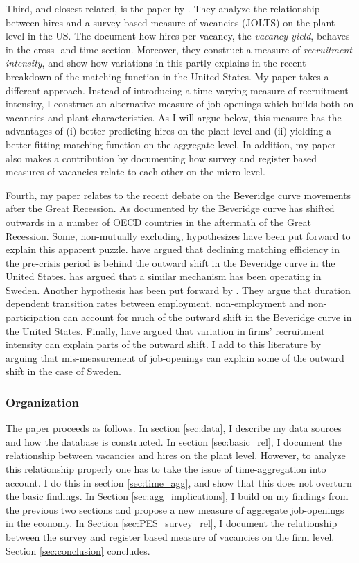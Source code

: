 Third, and closest related, is the paper by \cite{Davis2013}. They analyze the relationship between hires and a survey based measure of vacancies (JOLTS) on the plant level in the US. The document how hires per vacancy, the \emph{vacancy yield}, behaves in the cross- and time-section. Moreover, they construct a measure of \emph{recruitment intensity}, and show how variations in this partly explains in the recent breakdown of the matching function in the United States. My paper takes a different approach. Instead of introducing a time-varying measure of recruitment intensity, I construct an alternative measure of job-openings which builds both on vacancies and plant-characteristics. As I will argue below, this measure has the advantages of (i) better predicting hires on the plant-level and (ii) yielding a better fitting matching function on the aggregate level. In addition, my paper also makes a contribution by documenting how survey and register based measures of vacancies relate to each other on the micro level. 

Fourth, my paper relates to the recent debate on the Beveridge curve movements after the Great Recession. As documented by \cite{Hobijn2012} the Beveridge curve has shifted outwards in a number of OECD countries in the aftermath of the Great Recession. Some, non-mutually excluding, hypothesizes have been put forward to explain this apparent puzzle. \cite{Hall2015} have argued that declining matching efficiency in the pre-crisis period is behind the outward shift in the Beveridge curve in the United States. \cite{Riksbank2012} has argued that a similar mechanism has been operating in Sweden. Another hypothesis has been put forward by \cite{Kroft2016}. They argue that duration dependent transition rates between employment, non-employment and non-participation can account for much of the outward shift in the Beveridge curve in the United States. Finally, \cite{Davis2013} have argued that variation in firms’ recruitment intensity can explain parts of the outward shift. I add to this literature by arguing that mis-measurement of job-openings can explain some of the outward shift in the case of Sweden. 

\subsubsection{Organization}

The paper proceeds as follows. In section \ref{sec:data}, I describe my data sources and how the database is constructed. In section \ref{sec:basic_rel}, I document the relationship between vacancies and hires on the plant level. However, to analyze this relationship properly one has to take the issue of time-aggregation into account. I do this in section \ref{sec:time_agg}, and show that this does not overturn the basic findings. In Section \ref{sec:agg_implications}, I build on my findings from the previous two sections and propose a new measure of aggregate job-openings in the economy. In Section \ref{sec:PES_survey_rel}, I document the relationship between the survey and register based measure of vacancies on the firm level. Section \ref{sec:conclusion} concludes.